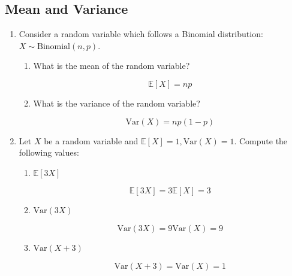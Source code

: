 \documentclass[a4paper]{article}
\theoremstyle{definition}
\newcommand{\Var}{\mathrm{Var}}
\newenvironment{soln}{
    \leavevmode\color{blue}\ignorespaces
}{}
\begin{document}
\subsection{Mean and Variance}
\begin{enumerate}
\item Consider a random variable which follows a Binomial
  distribution: $X \sim \text{Binomial}(n, p)$.
  \begin{enumerate}
  \item What is the mean of the random variable?\\
    \begin{soln}
    $$\mathbb{E}[X] = np$$
    \end{soln}
  \item What is the variance of the random variable?\\
    \begin{soln}
    $$\Var(X) = np(1-p)$$
    \end{soln}
  \end{enumerate}

\item Let $X$ be a random variable and
  $\mathbb{E}[X] = 1, \Var(X) = 1$. Compute the following values:
  \begin{enumerate}
  \item $\mathbb{E}[3X]$\\
    \begin{soln}
    $$\mathbb{E}[3X] = 3\mathbb{E}[X] = 3$$
    \end{soln}
  \item $\Var(3X)$\\
    \begin{soln}
    $$\Var(3X) = 9\Var(X) = 9$$
    \end{soln}
  \item $\Var(X+3)$\\
    \begin{soln}
    $$\Var(X+3) = \Var(X) = 1$$
    \end{soln}
  \end{enumerate}
\end{enumerate}

\end{document}
